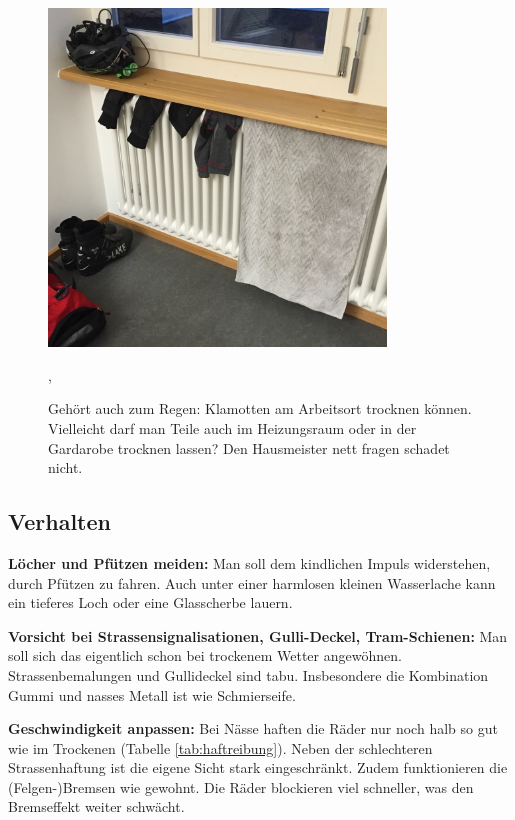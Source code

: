 \begin{figure}[htpb]
  \centering
  \includegraphics[width=0.8\textwidth]{figures/material-am-trocknen.jpg}
  \caption{Gehört auch zum Regen: Klamotten am Arbeitsort trocknen können.
    Vielleicht darf man Teile auch im Heizungsraum oder in der Gardarobe trocknen lassen?
    Den Hausmeister nett fragen schadet nicht.},
  \label{fig:material-am-trocknen}
\end{figure}

\subsection{Verhalten}

\textbf{Löcher und Pfützen meiden:}
Man soll dem kindlichen Impuls widerstehen, durch Pfützen zu fahren.
Auch unter einer harmlosen kleinen Wasserlache kann ein tieferes Loch oder eine Glasscherbe lauern.

\textbf{Vorsicht bei Strassensignalisationen, Gulli-Deckel, Tram-Schienen:}
Man soll sich das eigentlich schon bei trockenem Wetter angewöhnen.
Strassenbemalungen und Gullideckel sind tabu.
Insbesondere die Kombination Gummi und nasses Metall ist wie Schmierseife.

\textbf{Geschwindigkeit anpassen:}
Bei Nässe haften die Räder nur noch halb so gut wie im Trockenen (Tabelle \ref{tab:haftreibung}).
Neben der schlechteren Strassenhaftung ist die eigene Sicht stark eingeschränkt.
Zudem funktionieren die (Felgen-)Bremsen wie gewohnt.
Die Räder blockieren viel schneller, was den Bremseffekt weiter schwächt.

